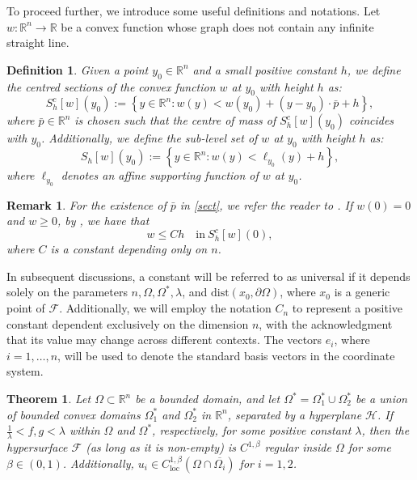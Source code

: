 \documentclass[10pt,a4paper]{amsart}
\theoremstyle{plain}
\newtheorem{theorem}{Theorem}[section]
\newtheorem{definition}{Definition}[section]
\newtheorem{remark}{Remark}[section]
\newcommand{\0}{\textbf{0}}
\numberwithin{equation}{section}
\numberwithin{equation}{section}
\numberwithin{figure}{section}
\begin{document}
To proceed further, we introduce some useful definitions and notations.
Let $w:\mathbb{R}^n\rightarrow \mathbb{R}$ be a convex function whose graph does not contain any infinite straight line.

\begin{definition}\label{defS}
Given a point $y_0\in \mathbb{R}^n$ and a small positive constant $h$, we define the centred sections of the convex function $w$ at $y_0$ with height $h$ as:
\begin{equation}\label{sect}
S^c_{h}[w](y_0) := \left\{y\in\mathbb{R}^n : w(y) < w(y_0) + (y-y_0)\cdot \bar{p} + h\right\},
\end{equation}
where $\bar{p}\in \mathbb{R}^n$ is chosen such that the centre of mass of $S^c_{h}[w](y_0)$ coincides with $y_0$.
Additionally, we define the sub-level set of $w$ at $y_0$ with height $h$ as:
\begin{equation}\label{sub}
S_h[w](y_0) := \left\{y\in \mathbb{R}^n : w(y) < \ell_{y_0}(y) + h\right\},
\end{equation}
where $\ell_{y_0}$ denotes an affine supporting function of $w$ at $y_0$.
\end{definition}

\begin{remark}
\emph{For the existence of $\bar{p}$ in \eqref{sect}, we refer the reader to \cite{C92b}.
If $w(0)=0$ and $w\geq 0$, by \cite[Remark 2.5]{CLW3}, we have that 
\begin{equation}\label{secrela}
w \leq Ch \quad \text{in}\ S^c_h[w](0),
\end{equation}
where $C$ is a constant depending only on $n$. }
\end{remark}


In subsequent discussions, a constant will be referred to as universal if it depends solely on the parameters $n, \Omega, \Omega^*, \lambda$, and $\text{dist}(x_0, \partial\Omega)$, where $x_0$ is a generic point of $\mathcal{F}$. Additionally, we will employ the notation $C_n$ to represent a positive constant dependent exclusively on the dimension $n$, with the acknowledgment that its value may change across different contexts. The vectors \( e_i \), where \( i = 1, \ldots, n \), will be used to denote the standard basis vectors in the coordinate system.

\begin{theorem}\label{t111}
Let $\Omega\subset\mathbb{R}^n$ be a bounded domain, and let $\Omega^* = \Omega^*_1 \cup \Omega^*_2$ be a union of bounded convex domains $\Omega^*_1$ and $\Omega^*_2$ in $\mathbb{R}^n$, separated by a hyperplane $\mathcal{H}$. If $\frac{1}{\lambda} < f, g < \lambda$ within $\Omega$ and $\Omega^*$, respectively, for some positive constant $\lambda$, then the hypersurface $\mathcal{F}$ (as long as it is non-empty) is $C^{1,\beta}$ regular inside $\Omega$ for some $\beta \in (0, 1)$. Additionally, $u_i \in C_{\text{loc}}^{1,\beta}(\Omega \cap \overline{\Omega_i})$ for $i = 1, 2$.
\end{theorem}
\end{document}
